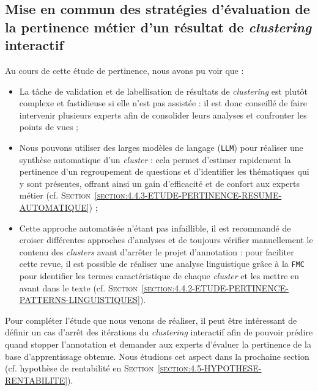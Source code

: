 		
	\subsection{Mise en commun des stratégies d'évaluation de la pertinence métier d'un résultat de \textit{clustering} interactif}
	\label{section:4.4.4-ETUDE-PERTINENCE-MISE-EN-COMMUN}
			
		\begin{leftBarSummary}
			Au cours de cette étude de pertinence, nous avons pu voir que :
			\begin{itemize}
				\item[\itemok] La tâche de validation et de labellisation de résultats de \textit{clustering} est plutôt complexe et fastidieuse si elle n'est pas assistée : il est donc conseillé de faire intervenir plusieurs experts afin de consolider leurs analyses et confronter les points de vues ;
				\item[\itemok] Nous pouvons utiliser des larges modèles de langage (\texttt{LLM}) pour réaliser une synthèse automatique d'un \textit{cluster} : cela permet d'estimer rapidement la pertinence d'un regroupement de questions et d'identifier les thématiques qui y sont présentes, offrant ainsi un gain d'efficacité et de confort aux experts métier (cf. \textsc{Section~\ref{section:4.4.3-ETUDE-PERTINENCE-RESUME-AUTOMATIQUE}}) ;
				\item[\itemok] Cette approche automatisée n'étant pas infaillible, il est recommandé de croiser différentes approches d'analyses et de toujours vérifier manuellement le contenu des \textit{clusters} avant d'arrêter le projet d'annotation : pour faciliter cette revue, il est possible de réaliser une analyse linguistique grâce à la \texttt{FMC} pour identifier les termes caractéristique de chaque \textit{cluster} et les mettre en avant dans le texte (cf. \textsc{Section~\ref{section:4.4.2-ETUDE-PERTINENCE-PATTERNS-LINGUISTIQUES}}).
			\end{itemize}
		\end{leftBarSummary}
		
		Pour compléter l'étude que nous venons de réaliser, il peut être intéressant de définir un cas d'arrêt des itérations du \textit{clustering} interactif afin de pouvoir prédire quand stopper l'annotation et demander aux experts d'évaluer la pertinence de la base d'apprentissage obtenue.
		Nous étudions cet aspect dans la prochaine section (cf. hypothèse de rentabilité en \textsc{Section~\ref{section:4.5-HYPOTHESE-RENTABILITE}}).
		